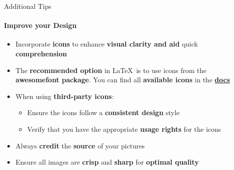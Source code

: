 \documentclass[aspectratio=169]{beamer}
\begin{document}
\begin{frame}{Additional Tips}
    \framesubtitle{Improve your Design}

    \begin{coloredblock}
        \begin{itemize}
            \item Incorporate \textbf{icons} to enhance \textbf{visual clarity and aid }quick \textbf{comprehension}
            \item The \textbf{recommended option} in \LaTeX~is to use icons from the \textbf{awesomefont package}. You can find all \textbf{available icons} in the \href{https://mirror.easyname.at/ctan/fonts/fontawesome5/doc/fontawesome5.pdf}{\textbf{docs}}
            \item When using \textbf{third-party icons}:
            \vspace{-0.5\topsep}
            \begin{itemize}
                \item Ensure the icons follow a \textbf{consistent design} style
                \item Verify that you have the appropriate \textbf{usage rights} for the icons
            \end{itemize}
        \end{itemize}
    \end{coloredblock}

        \begin{coloredblock}
            \begin{itemize}
                \item Always \textbf{credit} the \textbf{source} of your pictures
                \item Ensure all images are \textbf{crisp} and \textbf{sharp} for \textbf{optimal quality}
            \end{itemize}
        \end{coloredblock}
\end{frame}
\end{document}
